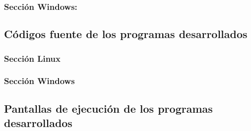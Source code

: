 \documentclass[12pt]{article}
\begin{document}
      \subsubsection{Sección Windows:}

      		         

    \subsection{Códigos fuente de los programas desarrollados}
  	

    	\subsubsection{Sección Linux}

    
    	\subsubsection{Sección Windows}
      	
\newpage


    \subsection{Pantallas de ejecución de los programas desarrollados}
      		
        
\end{document}
